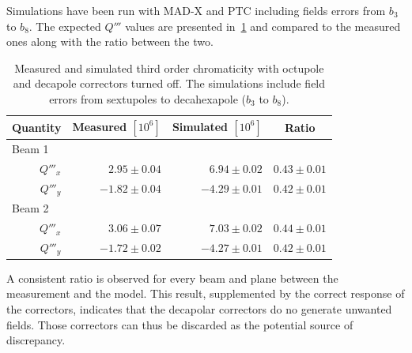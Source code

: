Simulations have been run with MAD-X and PTC including fields errors from $b_3$ to $b_8$. The
expected $Q'''$ values are presented in~\cref{table:decapoles:bare_chromaticity:virgin_dq3} and
compared to the measured ones along with the ratio between the two.

\begin{table}[tbh]
    \centering
    \begin{tabular}{rrrc}
    \hline
        \toprule
        Quantity  &  Measured $[10^6]$        &  Simulated $[10^{6}]$          &   Ratio       \\
        \midrule
        \multicolumn{1}{l}{Beam 1}    &                           &                                &               \\
         $Q'''_x$ &     $ 2.95 \pm 0.04$      &       $ 6.94 \pm 0.02$         &  $0.43 \pm 0.01$\\
         $Q'''_y$ &     $-1.82 \pm 0.04$      &       $-4.29 \pm 0.01$         &  $0.42 \pm 0.01$\\
        \multicolumn{1}{l}{Beam 2}    &                           &                                &               \\
         $Q'''_x$ &     $ 3.06 \pm 0.07$      &       $ 7.03 \pm 0.02$         &  $0.44 \pm 0.01$\\
         $Q'''_y$ &     $-1.72 \pm 0.02$      &       $-4.27 \pm 0.01$         &  $0.42 \pm 0.01$\\
         \bottomrule
    \end{tabular}
    \caption{Measured and simulated third order chromaticity with octupole and decapole correctors
    turned off. The simulations include field errors from sextupoles to decahexapole ($b_3$ to
    $b_8$).}
    \label{table:decapoles:bare_chromaticity:virgin_dq3}
\end{table}

A consistent ratio is observed for every beam and plane between the measurement and the model. This
result, supplemented by the correct response of the correctors, indicates that the decapolar
correctors do no generate unwanted fields. Those correctors can thus be discarded as the potential
source of discrepancy.